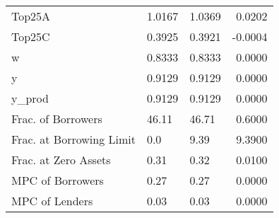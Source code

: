 \begin{table}
\begin{tabular}{lllr}
                  Top25A &  1.0167 &   1.0369 &  0.0202 \\
                  Top25C &  0.3925 &   0.3921 & -0.0004 \\
                       w &  0.8333 &   0.8333 &  0.0000 \\
                       y &  0.9129 &   0.9129 &  0.0000 \\
                  y\_prod &  0.9129 &   0.9129 &  0.0000 \\
      Frac. of Borrowers &   46.11 &    46.71 &  0.6000 \\
Frac. at Borrowing Limit &     0.0 &     9.39 &  9.3900 \\
    Frac. at Zero Assets &    0.31 &     0.32 &  0.0100 \\
        MPC of Borrowers &    0.27 &     0.27 &  0.0000 \\
          MPC of Lenders &    0.03 &     0.03 &  0.0000 \\
\bottomrule
\end{tabular}
\end{table}
